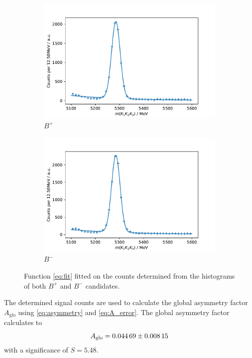 \begin{figure}[H]
	\centering
	\begin{subfigure}{0.45\textwidth}
		\includegraphics[width=\textwidth]{content/pictures/image_fin/invmassFitBN.pdf}
		\caption{$B^+$}
	\end{subfigure}
	\begin{subfigure}{0.45\textwidth}
		\includegraphics[width=\textwidth]{content/pictures/image_fin/invmassFitBP.pdf}
		\caption{$B^-$}
	\end{subfigure} 
	\caption{Function \autoref{eq:fit} fitted on the counts determined from the histograms of both $B^+$ and $B^-$ candidates.}
	\label{fig:fits}
\end{figure}

The determined signal counts are used to calculate the global asymmetry factor 
$A_\mathrm{glo}$ using \eqref{eq:asymmetry} and \eqref{eq:A_error}.  
The global asymmetry factor calculates to 
\begin{equation}
	A_\mathrm{glo} = \num{0.04469\pm0.00815}
\end{equation}
with a significance of $S = 5.48$. \\

